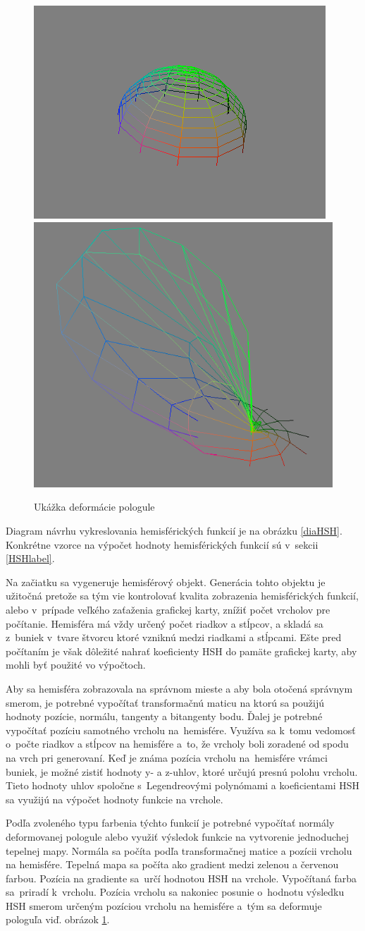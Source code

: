 \begin{figure}[b!] \label{Deform}
    \centering
    \includegraphics[width=0.35\linewidth]{obrazky-figures/HSHbefore.png}
    \includegraphics[width=0.3\linewidth]{obrazky-figures/HSHafter.png}
    \caption{Ukážka deformácie pologule}
\end{figure}

Diagram návrhu vykreslovania hemisférických funkcií je na obrázku \ref{diaHSH}. Konkrétne vzorce na výpočet hodnoty hemisférických funkcií sú v~sekcii \ref{HSHlabel}.

Na začiatku sa vygeneruje hemisférový objekt. Generácia tohto objektu je užitočná pretože sa tým vie kontrolovať kvalita zobrazenia hemisférických funkcií, alebo v~prípade veľkého zaťaženia grafickej karty, znížiť počet vrcholov pre počítanie. Hemisféra má vždy určený počet riadkov a stĺpcov, a skladá sa z~buniek v~tvare štvorcu ktoré vzniknú medzi riadkami a stĺpcami. Ešte pred počítaním je však dôležité nahrať koeficienty HSH do pamäte grafickej karty, aby mohli byť použité vo výpočtoch.

Aby sa hemisféra zobrazovala na správnom mieste a aby bola otočená správnym smerom, je potrebné vypočítať transformačnú maticu na ktorú sa použijú hodnoty pozície, normálu, tangenty a bitangenty bodu. Ďalej je potrebné vypočítať pozíciu samotného vrcholu na~hemisfére. Využíva sa k~tomu vedomosť o~počte riadkov a stĺpcov na hemisfére a~to, že vrcholy boli zoradené od spodu na vrch pri generovaní. Keď je známa pozícia vrcholu na~hemisfére vrámci buniek, je možné zistiť hodnoty y- a z-uhlov, ktoré určujú presnú polohu vrcholu. Tieto hodnoty uhlov spoločne s~Legendreovými polynómami a koeficientami HSH sa využijú na výpočet hodnoty funkcie na vrchole.

Podľa zvoleného typu farbenia týchto funkcií je potrebné vypočítať normály deformovanej pologule alebo využiť výsledok funkcie na vytvorenie jednoduchej tepelnej mapy. Normála sa počíta podľa transformačnej matice a pozícii vrcholu na hemisfére. Tepelná mapa sa počíta ako gradient medzi zelenou a červenou farbou. Pozícia na gradiente sa~určí hodnotou HSH na vrchole. Vypočítaná farba sa~priradí k~vrcholu. Pozícia vrcholu sa nakoniec posunie o~hodnotu výsledku HSH smerom určeným pozíciou vrcholu na hemisfére a~tým sa deformuje pologuľa viď. obrázok \ref{Deform}.

